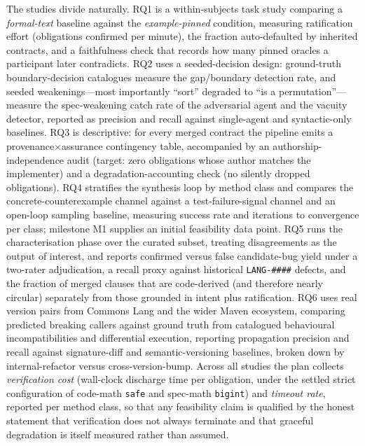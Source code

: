 The studies divide naturally. RQ1 is a within-subjects task study comparing a \emph{formal-text} baseline against the \emph{example-pinned} condition, measuring ratification effort (obligations confirmed per minute), the fraction auto-defaulted by inherited contracts, and a faithfulness check that records how many pinned oracles a participant later contradicts. RQ2 uses a seeded-decision design: ground-truth boundary-decision catalogues measure the gap/boundary detection rate, and seeded weakenings---most importantly ``sort'' degraded to ``is a permutation''---measure the spec-weakening catch rate of the adversarial agent and the vacuity detector, reported as precision and recall against single-agent and syntactic-only baselines. RQ3 is descriptive: for every merged contract the pipeline emits a provenance$\times$assurance contingency table, accompanied by an authorship-independence audit (target: zero obligations whose author matches the implementer) and a degradation-accounting check (no silently dropped obligations). RQ4 stratifies the synthesis loop by method class and compares the concrete-counterexample channel against a test-failure-signal channel and an open-loop sampling baseline, measuring success rate and iterations to convergence per class; milestone M1 supplies an initial feasibility data point. RQ5 runs the characterisation phase over the curated subset, treating disagreements as the output of interest, and reports confirmed versus false candidate-bug yield under a two-rater adjudication, a recall proxy against historical \texttt{LANG-\#\#\#\#} defects, and the fraction of merged clauses that are code-derived (and therefore nearly circular) separately from those grounded in intent plus ratification. RQ6 uses real version pairs from Commons Lang and the wider Maven ecosystem, comparing predicted breaking callers against ground truth from catalogued behavioural incompatibilities and differential execution, reporting propagation precision and recall against signature-diff and semantic-versioning baselines, broken down by internal-refactor versus cross-version-bump. Across all studies the plan collects \emph{verification cost} (wall-clock discharge time per obligation, under the settled strict configuration of code-math \texttt{safe} and spec-math \texttt{bigint}) and \emph{timeout rate}, reported per method class, so that any feasibility claim is qualified by the honest statement that verification does not always terminate and that graceful degradation is itself measured rather than assumed.

